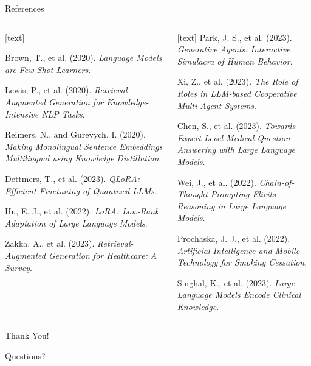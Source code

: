 \documentclass[aspectratio=169,xcolor=dvipsnames]{beamer}
\begin{document}
\begin{frame}{References}
  \tiny
  \begin{columns}
    \begin{column}{0.5\textwidth}
      \begin{thebibliography}{12}
        [text]
        
         Brown, T., et al. (2020). \textit{Language Models are Few-Shot Learners}.
        
         Lewis, P., et al. (2020). \textit{Retrieval-Augmented Generation for Knowledge-Intensive NLP Tasks}.
        
         Reimers, N., and Gurevych, I. (2020). \textit{Making Monolingual Sentence Embeddings Multilingual using Knowledge Distillation}.
        
         Dettmers, T., et al. (2023). \textit{QLoRA: Efficient Finetuning of Quantized LLMs}.
        
         Hu, E. J., et al. (2022). \textit{LoRA: Low-Rank Adaptation of Large Language Models}.
        
         Zakka, A., et al. (2023). \textit{Retrieval-Augmented Generation for Healthcare: A Survey}.
      \end{thebibliography}
    \end{column}
    
    \begin{column}{0.5\textwidth}
      \begin{thebibliography}{12}
        [text]
         Park, J. S., et al. (2023). \textit{Generative Agents: Interactive Simulacra of Human Behavior}.
        
         Xi, Z., et al. (2023). \textit{The Role of Roles in LLM-based Cooperative Multi-Agent Systems}.
        
         Chen, S., et al. (2023). \textit{Towards Expert-Level Medical Question Answering with Large Language Models}.
        
         Wei, J., et al. (2022). \textit{Chain-of-Thought Prompting Elicits Reasoning in Large Language Models}.
        
         Prochaska, J. J., et al. (2022). \textit{Artificial Intelligence and Mobile Technology for Smoking Cessation}.
        
         Singhal, K., et al. (2023). \textit{Large Language Models Encode Clinical Knowledge}.
      \end{thebibliography}
    \end{column}
  \end{columns}
\end{frame}
\begin{frame}[plain]
  \begin{center}
    \Huge Thank You!
    
    \vspace{1cm}
    \large Questions?
  \end{center}
\end{frame}
\end{document}
